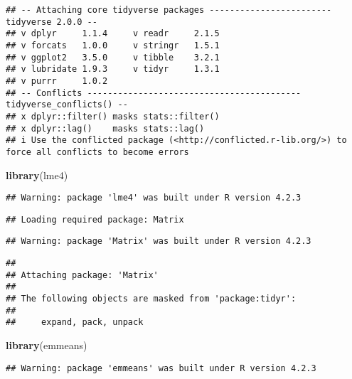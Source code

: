 \documentclass[
]{article}
\newenvironment{Shaded}{\begin{snugshade}}{\end{snugshade}}
\newcommand{\FunctionTok}[1]{\textcolor[rgb]{0.13,0.29,0.53}{\textbf{#1}}}
\newcommand{\NormalTok}[1]{#1}
\begin{document}
\begin{verbatim}
## -- Attaching core tidyverse packages ------------------------ tidyverse 2.0.0 --
## v dplyr     1.1.4     v readr     2.1.5
## v forcats   1.0.0     v stringr   1.5.1
## v ggplot2   3.5.0     v tibble    3.2.1
## v lubridate 1.9.3     v tidyr     1.3.1
## v purrr     1.0.2     
## -- Conflicts ------------------------------------------ tidyverse_conflicts() --
## x dplyr::filter() masks stats::filter()
## x dplyr::lag()    masks stats::lag()
## i Use the conflicted package (<http://conflicted.r-lib.org/>) to force all conflicts to become errors
\end{verbatim}

\begin{Shaded}
\begin{Highlighting}[]
\FunctionTok{library}\NormalTok{(lme4)}
\end{Highlighting}
\end{Shaded}

\begin{verbatim}
## Warning: package 'lme4' was built under R version 4.2.3
\end{verbatim}

\begin{verbatim}
## Loading required package: Matrix
\end{verbatim}

\begin{verbatim}
## Warning: package 'Matrix' was built under R version 4.2.3
\end{verbatim}

\begin{verbatim}
## 
## Attaching package: 'Matrix'
## 
## The following objects are masked from 'package:tidyr':
## 
##     expand, pack, unpack
\end{verbatim}

\begin{Shaded}
\begin{Highlighting}[]
\FunctionTok{library}\NormalTok{(emmeans)}
\end{Highlighting}
\end{Shaded}

\begin{verbatim}
## Warning: package 'emmeans' was built under R version 4.2.3
\end{verbatim}
\end{document}
